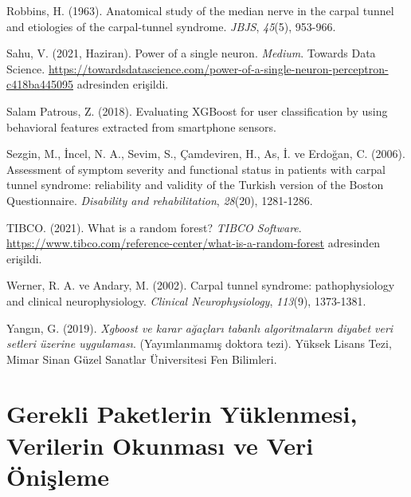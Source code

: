 \documentclass[12pt,twoside]{deuthesis}
\begin{document}
\begin{CSLReferences}{1}{0}
\leavevmode{}%
Robbins, H. (1963). Anatomical study of the median nerve in the carpal tunnel and etiologies of the carpal-tunnel syndrome. \emph{JBJS}, \emph{45}(5), 953-966.

\leavevmode{}%
Sahu, V. (2021, Haziran). Power of a single neuron. \emph{Medium}. Towards Data Science. \url{https://towardsdatascience.com/power-of-a-single-neuron-perceptron-c418ba445095} adresinden erişildi.

\leavevmode{}%
Salam Patrous, Z. (2018). Evaluating XGBoost for user classification by using behavioral features extracted from smartphone sensors.

\leavevmode{}%
Sezgin, M., İncel, N. A., Sevim, S., Çamdeviren, H., As, İ. ve Erdoğan, C. (2006). Assessment of symptom severity and functional status in patients with carpal tunnel syndrome: reliability and validity of the Turkish version of the Boston Questionnaire. \emph{Disability and rehabilitation}, \emph{28}(20), 1281-1286.

\leavevmode{}%
TIBCO. (2021). What is a random forest? \emph{TIBCO Software}. \url{https://www.tibco.com/reference-center/what-is-a-random-forest} adresinden erişildi.

\leavevmode{}%
Werner, R. A. ve Andary, M. (2002). Carpal tunnel syndrome: pathophysiology and clinical neurophysiology. \emph{Clinical Neurophysiology}, \emph{113}(9), 1373-1381.

\leavevmode{}%
Yangın, G. (2019). \emph{Xgboost ve karar ağaçları tabanlı algoritmaların diyabet veri setleri üzerine uygulaması}. (Yayımlanmamış doktora tezi). Yüksek Lisans Tezi, Mimar Sinan Güzel Sanatlar Üniversitesi Fen Bilimleri.

\end{CSLReferences}
\setlength{\parindent}{-0.20in}
\setlength{\leftskip}{0.20in}
\setlength{\parskip}{8pt}

\appendix

\hypertarget{gerekli-paketlerin-yuxfcklenmesi-verilerin-okunmasux131-ve-veri-uxf6niux15fleme}{%
\chapter{Gerekli Paketlerin Yüklenmesi, Verilerin Okunması ve Veri Önişleme}\label{gerekli-paketlerin-yuxfcklenmesi-verilerin-okunmasux131-ve-veri-uxf6niux15fleme}}
\end{document}
